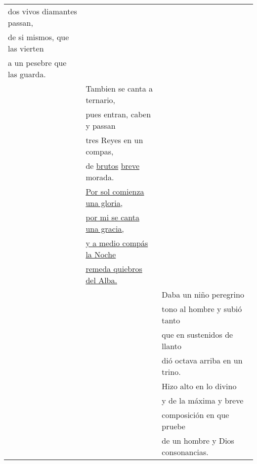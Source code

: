 \documentclass{aac-table}
\newcommand{\str}{\hspace{1em}}
\begin{document}
\begin{longtable}{lll}
    dos vivos diamantes passan, &
    & \\

    de si mismos, que las vierten &
    & \\

    a un pesebre que las guarda. 
    & \\

    & 
    \str{} Tambien se canta a ternario, 
    & \\

    & 
    pues entran, caben y passan 
    & \\

    & 
    tres Reyes en un compas, 
    & \\
    
    &
    de \uline{brutos} \uline{breve} morada. 
    & \\


    & 
    \str{} \uline{Por sol comienza una gloria,}  &
    \\

    & 
    \uline{por mi se canta una gracia,} & 
    \\
    
    & \uline{y a medio compás la Noche} & 
    \\

    & \uline{remeda quiebros del Alba.} &
    \\

    & 
    &
    \str{} Daba un niño peregrino \\
    
    &
    &
    tono al hombre y subió tanto \\
    
    &
    &
    que en sustenidos de llanto \\
    
    &
    &
    dió octava arriba en un trino. \\
    
    &
    &
    \str{} Hizo alto en lo divino \\
    
    &
    &
    y de la máxima y breve \\
    
    &
    &
    composición en que pruebe \\
    
    &
    &
    de un hombre y Dios consonancias. \\


    \bottomrule
\end{longtable}
\end{document}
